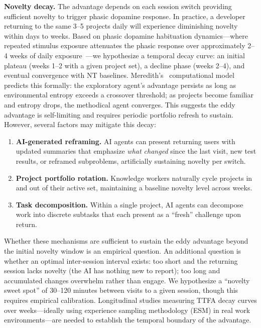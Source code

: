 \documentclass[sigconf,nonacm]{acmart}
\begin{document}
\textbf{Novelty decay.} The advantage depends on each session switch providing sufficient novelty to trigger phasic dopamine response. In practice, a developer returning to the same 3--5 projects daily will experience diminishing novelty within days to weeks. Based on phasic dopamine habituation dynamics---where repeated stimulus exposure attenuates the phasic response over approximately 2--4 weeks of daily exposure~\cite{grace2001}---we hypothesize a temporal decay curve: an initial plateau (weeks 1--2 with a given project set), a decline phase (weeks 2--4), and eventual convergence with NT baselines. Meredith's~\cite{meredith2025} computational model predicts this formally: the exploratory agent's advantage persists as long as environmental entropy exceeds a crossover threshold; as projects become familiar and entropy drops, the methodical agent converges. This suggests the eddy advantage is self-limiting and requires periodic portfolio refresh to sustain. However, several factors may mitigate this decay:

\begin{enumerate}
\item \textbf{AI-generated reframing.} AI agents can present returning users with updated summaries that emphasize \emph{what changed} since the last visit, new test results, or reframed subproblems, artificially sustaining novelty per switch.

\item \textbf{Project portfolio rotation.} Knowledge workers naturally cycle projects in and out of their active set, maintaining a baseline novelty level across weeks.

\item \textbf{Task decomposition.} Within a single project, AI agents can decompose work into discrete subtasks that each present as a ``fresh'' challenge upon return.
\end{enumerate}

Whether these mechanisms are sufficient to sustain the eddy advantage beyond the initial novelty window is an empirical question. An additional question is whether an optimal inter-session interval exists: too short and the returning session lacks novelty (the AI has nothing new to report); too long and accumulated changes overwhelm rather than engage. We hypothesize a ``novelty sweet spot'' of 30--120 minutes between visits to a given session, though this requires empirical calibration. Longitudinal studies measuring TTFA decay curves over weeks---ideally using experience sampling methodology (ESM) in real work environments---are needed to establish the temporal boundary of the advantage.
\end{document}
